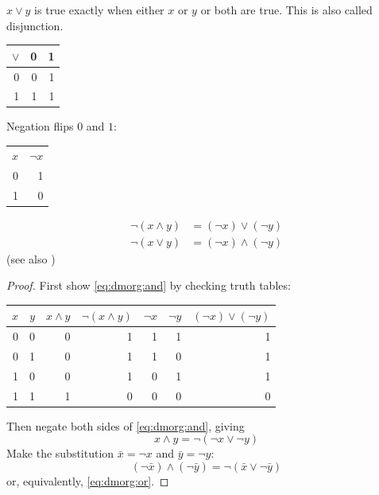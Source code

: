 \documentclass{scrbook}
\begin{document}
\begin{defn}[or $\vee$]
  \label{def:bool:or}
  $x \vee y$ is true exactly when either $x$ or $y$ or both are true. This is also called disjunction.
  \begin{center}
\begin{tabular}{r|rr}
$\vee$ & 0 & 1 \\
  \hline
0 & 0 & 1 \\
1 & 1 & 1 
\end{tabular}
\end{center}
\end{defn}
\begin{defn}
Negation flips $0$ and $1$:
  \begin{center}
\begin{tabular}{rr}
$x$ & $\neg x$ \\
0 & 1 \\
1 & 0 
\end{tabular}
\end{center}
\end{defn}

\begin{theorem}
  \begin{align}
    \neg(x\wedge y) &=  (\neg x) \vee (\neg y) \label{eq:dmorg:and} \\
    \neg(x \vee y) &= (\neg x) \wedge (\neg y) \label{eq:dmorg:or}
  \end{align}
  (see also \cite{wiki:demorgan})
\end{theorem}
\begin{proof}
 First show \cref{eq:dmorg:and} by checking truth tables:
 \begin{center}
\begin{tabular}{rrrrrrr}
$x$ & $y$ & $x\wedge y$ & $\neg(x\wedge y)$ & $\neg x$ & $\neg y$ & $(\neg x)\vee (\neg y)$ \\
\hline
0 & 0 & 0 & 1 & 1 & 1 & 1 \\
0 & 1 & 0 & 1 & 1 & 0 & 1 \\
1 & 0 & 0 & 1 & 0 & 1 & 1 \\
1 & 1 & 1 & 0 & 0 & 0 & 0 
\end{tabular}
\end{center}
Then negate both sides of \cref{eq:dmorg:and}, giving 
\[
x\wedge y = \neg(\neg x \vee \neg y)
\]
Make the substitution $\bar x = \neg x$ and $\bar y =\neg y$:
\[
(\neg \bar x)\wedge (\neg \bar y) = \neg(\bar x \vee \neg \bar y)
\]
or, equivalently, \cref{eq:dmorg:or}. 
\end{proof}
\end{document}
